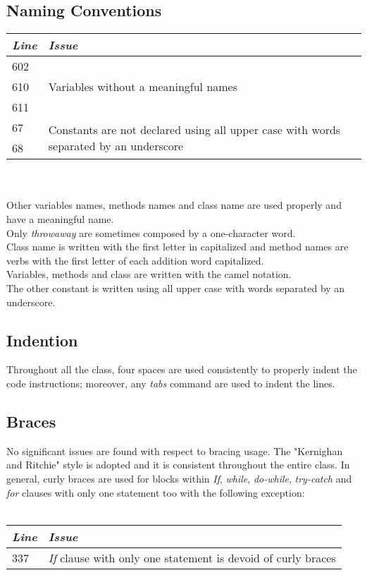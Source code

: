 \documentclass[11pt,a4paper]{report}
\begin{document}
\subsection{Naming Conventions}
\begin{tabularx}{\textwidth}{|l|X|}
	\hline
	\textit{Line} & \textit{Issue}\\
	\hline
	602 & \multirow{3}{*}{Variables without a meaningful names}\\
	610 & \\
	611 & \\
	\hline
	\hline
	67 & \multirow{2}{\linewidth}{{Constants are not declared using all upper case with words separated by an underscore}}\\
	68 & \\
	\hline
\end{tabularx}
\\\\
Other variables names, methods names and class name are used properly and have a meaningful name.\\Only \textit{throwaway} are sometimes composed by a one-character word.\\Class name is written with the first letter in capitalized and method names are verbs with the first letter of each addition word capitalized.\\Variables, methods and class are written with the camel notation.\\The other constant is written using all upper case with words separated by an underscore.
\subsection{Indention}
Throughout all the class, four spaces are used consistently to properly indent the code instructions; moreover, any \textit{tabs} command are used to indent the	 lines.
\subsection{Braces}
No significant issues are found with respect to bracing usage. The "Kernighan and Ritchie" style is adopted and it is consistent throughout the entire class. In general, curly braces are used for blocks within \textit{If}, \textit{while}, \textit{do-while}, \textit{try-catch} and \textit{for} clauses with only one statement too with the following exception:
\\\\
\begin{tabularx}{\textwidth}{|l|X|}
	\hline
	\textit{Line} & \textit{Issue}\\
	\hline
	337 & \multirow{1}{*}{\textit{If} clause with only one statement is devoid of curly braces}\\
	\hline
\end{tabularx}
\end{document}
